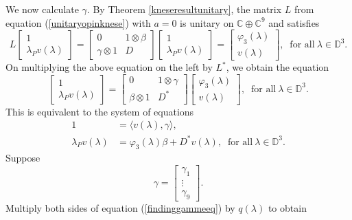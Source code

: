 \documentclass[11pt, reqno]{amsart}
\newcommand\1{\boldsymbol {1}}
\newcommand{\D}{\mathbb{D}}
\numberwithin{equation}{section}
\begin{document}
 We now calculate $\gamma$. By Theorem \ref{kneseresultunitary}, the matrix $L$ from equation (\ref{unitaryopinknese}) with $a=0$ is unitary on $\mathbb{C}\oplus\mathbb{C}^{9}$ and satisfies
\begin{equation} 
L \begin{bmatrix}
    1 \\
    \lambda_{P}v(\lambda) 
\end{bmatrix} =
\begin{bmatrix}
    0 & 1\otimes\beta\\
    \gamma\otimes 1 & D
\end{bmatrix}\begin{bmatrix}
    1 \\
    \lambda_{P}v(\lambda) 
\end{bmatrix} = \begin{bmatrix}
    \varphi_3(\lambda)\\
    v(\lambda)
\end{bmatrix},\ \text{ for all} \ \lambda \in \D^3.
\end{equation}
On multiplying the above equation on the left by $L^{*}$, we obtain the equation
$$\begin{bmatrix}
    1 \\
    \lambda_{P}v(\lambda) 
\end{bmatrix} = \begin{bmatrix}
    0 & 1\otimes\gamma\\
    \beta\otimes 1 & D^{*}
\end{bmatrix} \begin{bmatrix}
    \varphi_3(\lambda)\\
    v(\lambda) 
\end{bmatrix}, \ \text{ for all} \ \lambda \in \D^3.$$
This is equivalent to the system of equations
\begin{align}
 1&=\langle v(\lambda), \gamma \rangle,\label{findinggammeeq}\\
    \lambda_{P}v(\lambda) &= \varphi_3(\lambda)\beta+D^{*}v(\lambda), \ \text{ for all} \ \lambda \in \D^3.\nonumber
\end{align}
Suppose 
$$\gamma=\begin{bmatrix}
    \gamma_{1}\\
    \vdots\\
    \gamma_{9}
\end{bmatrix}.$$
Multiply both sides of equation (\ref{findinggammeeq}) by $q(\lambda)$ to obtain 
\end{document}
